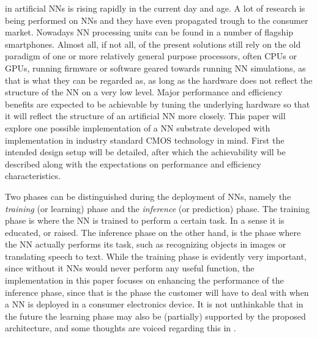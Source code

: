 
 in artificial \acp{NN} is rising rapidly in the current day and age. A lot of research is being performed on \acp{NN} and they have even propagated trough to the consumer market. Nowadays \ac{NN} processing units can be found in a number of flagship smartphones. Almost all, if not all, of the present solutions still rely on the old paradigm of one or more relatively general purpose processors, often \acp{CPU} or \acp{GPU}, running firmware or software geared towards running \ac{NN} simulations, as that is what they can be regarded as, as long as the hardware does not reflect the structure of the \ac{NN} on a very low level. Major performance and efficiency benefits are expected to be achievable by tuning the underlying hardware so that it will reflect the structure of an artificial \ac{NN} more closely. This paper will explore one possible implementation of a \ac{NN} substrate developed with implementation in industry standard CMOS technology in mind. First the intended design setup will be detailed, after which the achievability will be described along with the expectations on performance and efficiency characteristics.

Two phases can be distinguished during the deployment of \acp{NN}, namely the \textit{training} (or learning) phase and the \textit{inference} (or prediction) phase\cite{8192463}. The training phase is where the \ac{NN} is trained to perform a certain task. In a sense it is educated, or raised. The inference phase on the other hand, is the phase where the \ac{NN} actually performs its task, such as recognizing objects in images or translating speech to text. While the training phase is evidently very important, since without it \acp{NN} would never perform any useful function, the implementation in this paper focuses on enhancing the performance of the inference phase, since that is the phase the customer will have to deal with when a \ac{NN} is deployed in a consumer electronics device. It is not unthinkable that in the future the learning phase may also be (partially) supported by the proposed architecture, and some thoughts are voiced regarding this in .

